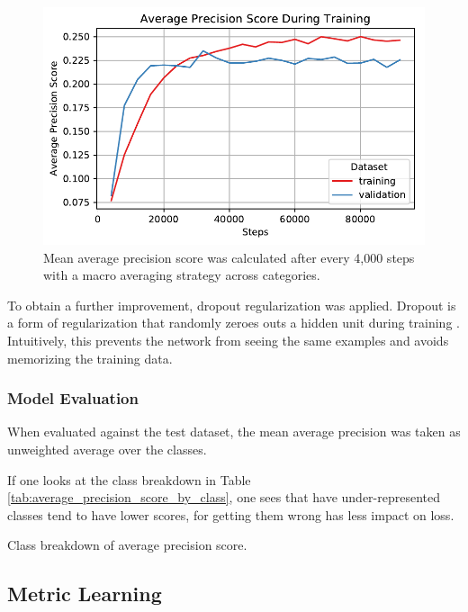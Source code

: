 \documentclass[letterpaper]{article}
\begin{document}
\begin{figure}
  \centering
  \includegraphics{object_detection/training_average_precision_score.pdf}
  \caption{Mean average precision score was calculated after every 4,000 steps
    with a macro averaging strategy across categories.}
  \label{fig:training_average_precision_score}
\end{figure}

To obtain a further improvement, dropout regularization was applied. Dropout is
a form of regularization that randomly zeroes outs a hidden unit during training
\citep{dropout}. Intuitively, this prevents the network from seeing the same
examples and avoids memorizing the training data.

\subsubsection{Model Evaluation}

When evaluated against the test dataset, the mean average precision was
taken as
unweighted average over the classes.

If one looks at the class breakdown in Table
\ref{tab:average_precision_score_by_class}, one sees that have under-represented
classes tend to have lower scores, for getting them wrong has less impact on
loss.

\begin{table}
  \centering
  
  \caption{Class breakdown of average precision score.}
  \label{tab:average_precision_score_by_class}
\end{table}

\subsection{Metric Learning}
\end{document}
